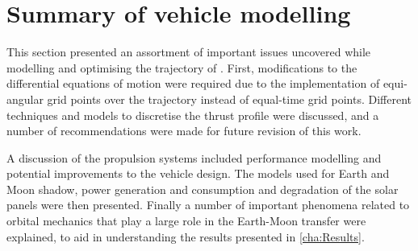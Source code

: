 \section{Summary of vehicle modelling} \label{sec:Summary-vehicle}

This section presented an assortment of important issues uncovered while modelling and optimising the trajectory of \BW. First, modifications to the differential equations of motion were required due to the implementation of equi-angular grid points over the trajectory instead of equal-time grid points. Different techniques and models to discretise the thrust profile were discussed, and a number of recommendations were made for future revision of this work. 

A discussion of the propulsion systems included performance modelling and potential improvements to the vehicle design. The models used for Earth and Moon shadow, power generation and consumption and degradation of the solar panels were then presented. Finally a number of important phenomena related to orbital mechanics that play a large role in the Earth-Moon transfer were explained, to aid in understanding the results presented in \autoref{cha:Results}.
